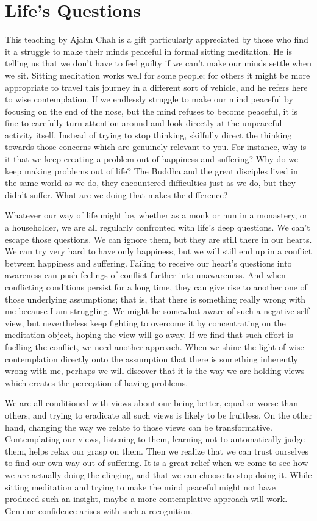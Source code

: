 \section{Life's Questions}

This teaching by Ajahn Chah is a gift particularly appreciated by those
who find it a struggle to make their minds peaceful in formal sitting
meditation. He is telling us that we don’t have to feel guilty if we
can’t make our minds settle when we sit. Sitting meditation works well
for some people; for others it might be more appropriate to travel this
journey in a different sort of vehicle, and he refers here to wise
contemplation. If we endlessly struggle to make our mind peaceful by
focusing on the end of the nose, but the mind refuses to become
peaceful, it is fine to carefully turn attention around and look
directly at the unpeaceful activity itself. Instead of trying to stop
thinking, skilfully direct the thinking towards those concerns which are
genuinely relevant to you. For instance, why is it that we keep creating
a problem out of happiness and suffering? Why do we keep making problems
out of life? The Buddha and the great disciples lived in the same world
as we do, they encountered difficulties just as we do, but they didn’t
suffer. What are we doing that makes the difference?

Whatever our way of life might be, whether as a monk or nun in a
monastery, or a householder, we are all regularly confronted with life’s
deep questions. We can’t escape those questions. We can ignore them, but
they are still there in our hearts. We can try very hard to have only
happiness, but we will still end up in a conflict between happiness and
suffering. Failing to receive our heart’s questions into awareness can
push feelings of conflict further into unawareness. And when conflicting
conditions persist for a long time, they can give rise to another one of
those underlying assumptions; that is, that there is something really
wrong with me because I am struggling. We might be somewhat aware of
such a negative self-view, but nevertheless keep fighting to overcome it
by concentrating on the meditation object, hoping the view will go away.
If we find that such effort is fuelling the conflict, we need another
approach. When we shine the light of wise contemplation directly onto
the assumption that there is something inherently wrong with me, perhaps
we will discover that it is the way we are holding views which creates
the perception of having problems.

We are all conditioned with views about our being better, equal or worse
than others, and trying to eradicate all such views is likely to be
fruitless. On the other hand, changing the way we relate to those views
can be transformative. Contemplating our views, listening to them,
learning not to automatically judge them, helps relax our grasp on them.
Then we realize that we can trust ourselves to find our own way out of
suffering. It is a great relief when we come to see how we are actually
doing the clinging, and that we can choose to stop doing it. While
sitting meditation and trying to make the mind peaceful might not have
produced such an insight, maybe a more contemplative approach will work.
Genuine confidence arises with such a recognition.

